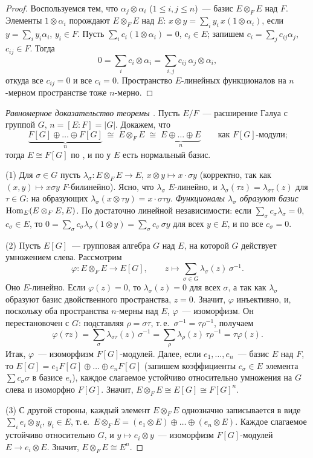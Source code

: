 \begin{proof}
Воспользуемся тем, что $\alpha_j\otimes\alpha_i$ ($1\le i,j\le n$)~--- базис $E\otimes_FE$ над $F$. Элементы
$1\otimes\alpha_i$ порождают $E\otimes_FE$ над $E$: $x\otimes y=\sum_iy_i\,x(1\otimes\alpha_i)$, если
$y=\sum_iy_i\alpha_i$, $y_i\in F$. Пусть $\sum_ic_i(1\otimes\alpha_i)=0$, $c_i\in E$; запишем $c_i=\sum_jc_{ij}\alpha_j$,
$c_{ij}\in F$. Тогда
\[
0=\sum_ic_i\otimes\alpha_i=\sum_{i,j}c_{ij}\,\alpha_j\otimes\alpha_i,
\]
откуда все $c_{ij}=0$ и все $c_i=0$. Пространство $E$-линейных функционалов на $n$-мерном пространстве тоже $n$-мерно.
\end{proof}

\begin{proof}[Равномерное доказательство теоремы ]
Пусть $E/F$~--- расширение Галуа с группой $G$, $n=[E:F]=|G|$. Докажем, что
\[
\underbrace{F[G]\oplus\dots\oplus F[G]}_n\;\cong\;E\otimes_FE\;\cong\;\underbrace{E\oplus\dots\oplus E}_n
\qquad\text{как $F[G]$-модули;}
\]
тогда $E\cong F[G]$ по , и по  у $E$ есть нормальный базис.

(1) Для $\sigma\in G$ пусть $\lambda_\sigma\colon E\otimes_FE\to E$, $x\otimes y\mapsto x\cdot\sigma y$ (корректно, так как
$(x,y)\mapsto x\sigma y$ $F$-билинейно). Ясно, что $\lambda_\sigma$ $E$-линейно, и $\lambda_\sigma(\tau z)=\lambda_{\sigma\tau}(z)$
для $\tau\in G$: на образующих $\lambda_\sigma(x\otimes\tau y)=x\cdot\sigma\tau y$. \emph{Функционалы $\lambda_\sigma$
образуют базис $\operatorname{Hom}_E(E\otimes_FE,E)$.} По  достаточно линейной независимости: если $\sum_\sigma c_\sigma\lambda_\sigma=0$,
$c_\sigma\in E$, то $0=\sum_\sigma c_\sigma\lambda_\sigma(1\otimes y)=\sum_\sigma c_\sigma\,\sigma y$ для всех $y\in E$, и по
 все $c_\sigma=0$.

(2) Пусть $E[G]$~--- групповая алгебра $G$ над $E$, на которой $G$ действует умножением слева. Рассмотрим
\[
\varphi\colon E\otimes_FE\to E[G],\qquad z\mapsto\sum_{\sigma\in G}\lambda_\sigma(z)\,\sigma^{-1}.
\]
Оно $E$-линейно. Если $\varphi(z)=0$, то $\lambda_\sigma(z)=0$ для всех $\sigma$, а так как $\lambda_\sigma$ образуют базис
двойственного пространства, $z=0$. Значит, $\varphi$ инъективно, и, поскольку оба пространства $n$-мерны над $E$,
$\varphi$~--- изоморфизм. Он перестановочен с $G$: подставляя $\rho=\sigma\tau$, т.\,е.\ $\sigma^{-1}=\tau\rho^{-1}$, получаем
\[
\varphi(\tau z)=\sum_\sigma\lambda_{\sigma\tau}(z)\,\sigma^{-1}=\sum_\rho\lambda_\rho(z)\,\tau\rho^{-1}=\tau\varphi(z).
\]
Итак, $\varphi$~--- изоморфизм $F[G]$-модулей. Далее, если $e_1,\dots,e_n$~--- базис $E$ над $F$, то
$E[G]=e_1F[G]\oplus\dots\oplus e_nF[G]$ (запишем коэффициенты $c_\sigma\in E$ элемента $\sum c_\sigma\sigma$ в базисе
$e_i$), каждое слагаемое устойчиво относительно умножения на $G$ слева и изоморфно $F[G]$. Значит,
$E\otimes_FE\cong E[G]\cong F[G]^n$.

(3) С другой стороны, каждый элемент $E\otimes_FE$ однозначно записывается в виде $\sum_ie_i\otimes y_i$, $y_i\in E$,
т.\,е.\ $E\otimes_FE=(e_1\otimes E)\oplus\dots\oplus(e_n\otimes E)$. Каждое слагаемое устойчиво относительно $G$, и
$y\mapsto e_i\otimes y$~--- изоморфизм $F[G]$-модулей $E\to e_i\otimes E$. Значит, $E\otimes_FE\cong E^n$.
\end{proof}

